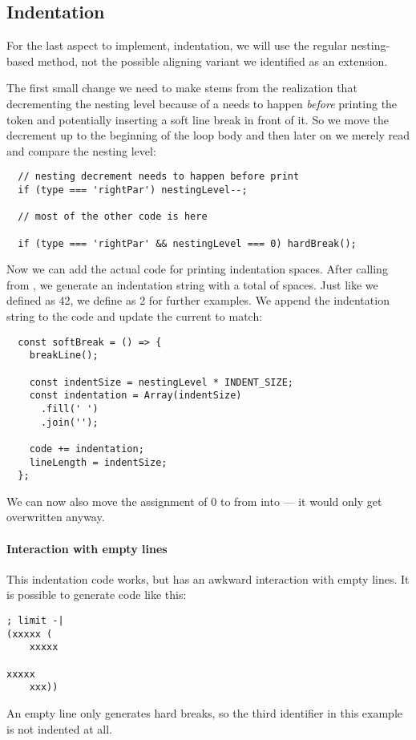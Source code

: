 \subsection{Indentation}
For the last aspect to implement, indentation,
we will use the regular nesting-based method,
not the possible aligning variant
we identified as an extension.

The first small change we need to make
stems from the realization that
decrementing the nesting level
because of a  needs to happen
\textit{before} printing the token
and potentially inserting a
soft line break in front of it.
So we move the decrement up
to the beginning of the loop body
and then later on we merely
read and compare the nesting level:
\begin{verbatim}
  // nesting decrement needs to happen before print
  if (type === 'rightPar') nestingLevel--;

  // most of the other code is here

  if (type === 'rightPar' && nestingLevel === 0) hardBreak();
\end{verbatim}

Now we can add the actual code for printing indentation spaces.
After calling  from ,
we generate an indentation string with
a total of  spaces.
Just like we defined  as 42,
we define  as 2 for further examples.
We append the indentation string to the code
and update the current  to match:
\begin{verbatim}
  const softBreak = () => {
    breakLine();

    const indentSize = nestingLevel * INDENT_SIZE;
    const indentation = Array(indentSize)
      .fill(' ')
      .join('');

    code += indentation;
    lineLength = indentSize;
  };
\end{verbatim}
We can now also move the assignment of 0 to 
from  into  ---
it would only get overwritten anyway.

\paragraph{Interaction with empty lines}
This indentation code works,
but has an awkward interaction with empty lines.
It is possible to generate code like this:
\begin{verbatim}
; limit -|
(xxxxx (
    xxxxx

xxxxx
    xxx))
\end{verbatim}
An empty line only generates hard breaks,
so the third identifier in this example
is not indented at all.

